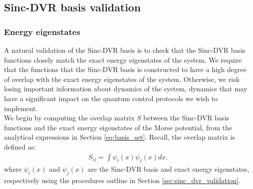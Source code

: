 \documentclass{subfiles}
\begin{document}
\subsection{Sinc-DVR basis validation}
\subsubsection*{Energy eigenstates}
A natural validation of the Sinc-DVR basis is to check that the Sinc-DVR basis functions closely match the exact energy eigenstates of the system. We require that the functions that the Sinc-DVR basis is constructed to have a high degree of overlap with the exact energy eigenstates of the system. Otherwise, we risk losing important information about dynamics of the system, dynamics that may have a significant impact on the quantum control protocols we wish to implement.\\ 

We begin by computing the overlap matrix $S$ between the Sinc-DVR basis functions and the exact energy eigenstates of the Morse potential, from the analytical expressions in Section \ref{eq:basis_set}. Recall, the overlap matrix is defined as:
\begin{align*}
    S_{ij} = \int \psi_i(x) \psi_j(x) dx,
\end{align*}
where $\psi_i(x)$ and $\psi_j(x)$ are the Sinc-DVR basis and exact energy eigenstates, respectively using the procedures outline in Section \ref{sec:sinc_dvr_validation}.
\end{document}
